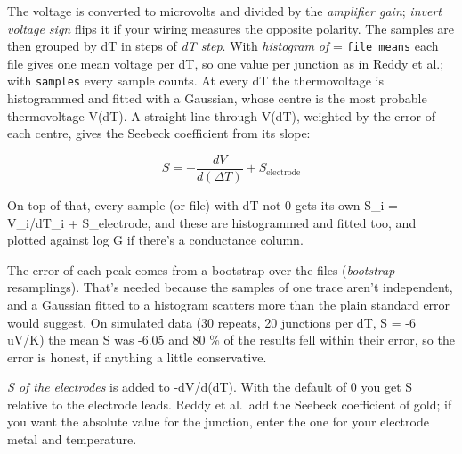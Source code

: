 \documentclass[
  11pt,
  a4paper,
]{article}
\begin{document}
The voltage is converted to microvolts and divided by the
\emph{amplifier gain}; \emph{invert voltage sign} flips it if your
wiring measures the opposite polarity. The samples are then grouped by
dT in steps of \emph{dT step}. With \emph{histogram of} =
\texttt{file means} each file gives one mean voltage per dT, so one
value per junction as in Reddy et al.; with \texttt{samples} every
sample counts. At every dT the thermovoltage is histogrammed and fitted
with a Gaussian, whose centre is the most probable thermovoltage V(dT).
A straight line through V(dT), weighted by the error of each centre,
gives the Seebeck coefficient from its slope:

\[
S = -\frac{dV}{d(\Delta T)} + S_\mathrm{electrode}
\]

On top of that, every sample (or file) with dT not 0 gets its own S\_i =
-V\_i/dT\_i + S\_electrode, and these are histogrammed and fitted too,
and plotted against log G if there's a conductance column.

The error of each peak comes from a bootstrap over the files
(\emph{bootstrap} resamplings). That's needed because the samples of one
trace aren't independent, and a Gaussian fitted to a histogram scatters
more than the plain standard error would suggest. On simulated data (30
repeats, 20 junctions per dT, S = -6 uV/K) the mean S was -6.05 and 80
\% of the results fell within their error, so the error is honest, if
anything a little conservative.

\emph{S of the electrodes} is added to -dV/d(dT). With the default of 0
you get S relative to the electrode leads. Reddy et al.~add the Seebeck
coefficient of gold; if you want the absolute value for the junction,
enter the one for your electrode metal and temperature.
\end{document}
